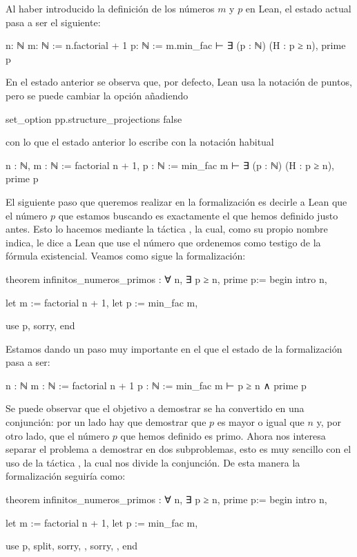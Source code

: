Al haber introducido la definición de los números \(m\) y \(p\) en Lean,
el estado actual pasa a ser el siguiente:
\begin{leancode}
n: ℕ
m: ℕ := n.factorial + 1
p: ℕ := m.min_fac
⊢ ∃ (p : ℕ) (H : p ≥ n), prime p
\end{leancode}

En el estado anterior se observa que, por defecto, Lean usa la notación
de puntos, pero se puede cambiar la opción añadiendo
\begin{leancode}
set_option pp.structure_projections false
\end{leancode}
con lo que el estado anterior lo escribe con la notación habitual
\begin{leancode}
n : ℕ,
m : ℕ := factorial n + 1,
p : ℕ := min_fac m
⊢ ∃ (p : ℕ) (H : p ≥ n), prime p
\end{leancode}

El siguiente paso que queremos realizar en la formalización es decirle a
Lean que el número \(p\) que estamos buscando es exactamente el que
hemos definido justo antes. Esto lo hacemos mediante la táctica
, la cual, como su propio nombre indica, le dice a
Lean que use el número que ordenemos como testigo de la fórmula
existencial. Veamos como sigue la formalización:

\begin{leancode}
theorem infinitos_numeros_primos : ∀ n, ∃ p ≥ n, prime p:=
begin
  intro n,

  let m := factorial n + 1,
  let p := min_fac m,

  use p,
  sorry,
end
\end{leancode}

Estamos dando un paso muy importante en el que el estado de la formalización
pasa a ser:
\begin{leancode}
n : ℕ
m : ℕ := factorial n + 1
p : ℕ := min_fac m
⊢ p ≥ n ∧ prime p
\end{leancode}

Se puede observar que el objetivo a demostrar se ha convertido en una
conjunción: por un lado hay que demostrar que \(p\) es mayor o igual que
\(n\) y, por otro lado, que el número \(p\) que hemos definido es primo. Ahora
nos interesa separar el problema a demostrar en dos subproblemas, esto es
muy sencillo con el uso de la táctica , la cual nos
divide la conjunción. De esta manera la formalización seguiría como:
\begin{leancode}
theorem infinitos_numeros_primos : ∀ n, ∃ p ≥ n, prime p:=
begin
  intro n,

  let m := factorial n + 1,
  let p := min_fac m,

  use p,
  split,
  { sorry, },
  { sorry, },
end
\end{leancode}

